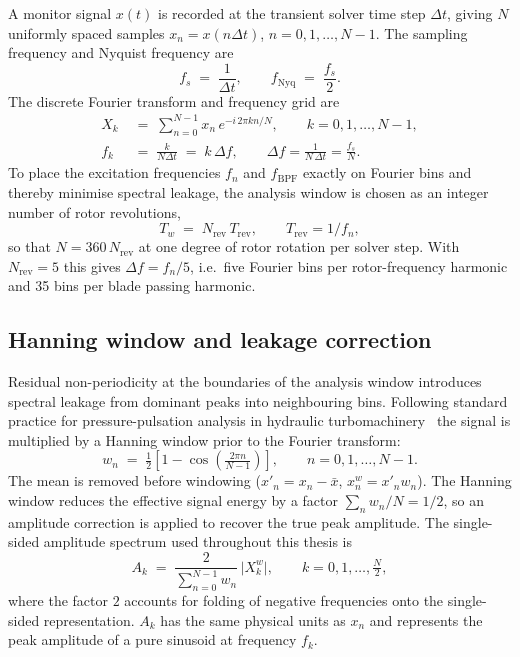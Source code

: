 A monitor signal $x(t)$ is recorded at the transient solver time step $\Delta t$, giving $N$ uniformly spaced samples $x_n = x(n\Delta t)$, $n = 0,1,\dots,N-1$. The sampling frequency and Nyquist frequency are
\begin{equation}
    f_s \;=\; \frac{1}{\Delta t},\qquad
    f_{\mathrm{Nyq}} \;=\; \frac{f_s}{2}. \label{eq:fs_fnyq}
\end{equation}
The discrete Fourier transform and frequency grid are
\begin{align}
    X_k &\;=\; \sum_{n=0}^{N-1} x_n\, e^{-i\,2\pi k n / N},
    \qquad k = 0,1,\dots,N-1, \label{eq:dft}\\
    f_k &\;=\; \frac{k}{N\Delta t} \;=\; k\,\Delta f,
    \qquad \Delta f = \frac{1}{N\,\Delta t} = \frac{f_s}{N}.
    \label{eq:dft_f}
\end{align}
To place the excitation frequencies $f_n$ and $f_{\mathrm{BPF}}$ exactly on Fourier bins and thereby minimise spectral leakage, the analysis window is chosen as an integer number of rotor revolutions,
\begin{equation}
    T_w \;=\; N_{\mathrm{rev}}\,T_{\mathrm{rev}},
    \qquad T_{\mathrm{rev}} = 1/f_n, \label{eq:Tw}
\end{equation}
so that $N = 360\,N_{\mathrm{rev}}$ at one degree of rotor rotation per solver step. With $N_{\mathrm{rev}}=5$ this gives $\Delta f = f_n/5$, i.e.\ five Fourier bins per rotor-frequency harmonic and 35 bins per blade passing harmonic.
 
\subsection{Hanning window and leakage correction}
\label{sec:spec-window}
 
Residual non-periodicity at the boundaries of the analysis window introduces spectral leakage from dominant peaks into neighbouring bins. Following standard practice for pressure-pulsation analysis in hydraulic turbomachinery~\cite{Kerlefsen2025,Bergan2018} the signal is multiplied by a Hanning window prior to the Fourier transform:
\begin{equation}
    w_n \;=\; \tfrac{1}{2}\!\left[ 1 - \cos\!\left(\tfrac{2\pi n}{N-1}\right)\right],
    \qquad n = 0,1,\dots,N-1. \label{eq:hanning}
\end{equation}
The mean is removed before windowing ($x'_n = x_n - \bar{x}$, $x^{w}_n = x'_n w_n$). The Hanning window reduces the effective signal energy by a factor $\sum_n w_n / N = 1/2$, so an amplitude correction is applied to recover the true peak amplitude. The single-sided amplitude spectrum used throughout this thesis is
\begin{equation}
    A_k \;=\; \frac{2}{\displaystyle\sum_{n=0}^{N-1} w_n}\,
      \bigl|X^{w}_k\bigr|,
    \qquad k = 0,1,\dots,\tfrac{N}{2}, \label{eq:amplitude}
\end{equation}
where the factor $2$ accounts for folding of negative frequencies onto the single-sided representation. $A_k$ has the same physical units as $x_n$ and represents the peak amplitude of a pure sinusoid at frequency $f_k$.
 
